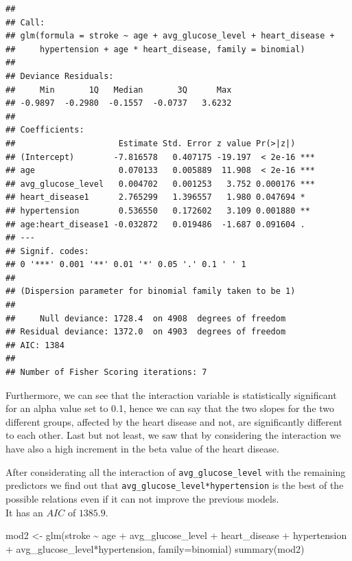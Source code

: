 \documentclass[
]{article}
\newenvironment{Shaded}{\begin{snugshade}}{\end{snugshade}}
\newcommand{\AttributeTok}[1]{\textcolor[rgb]{0.77,0.63,0.00}{#1}}
\newcommand{\FunctionTok}[1]{\textcolor[rgb]{0.00,0.00,0.00}{#1}}
\newcommand{\NormalTok}[1]{#1}
\newcommand{\OtherTok}[1]{\textcolor[rgb]{0.56,0.35,0.01}{#1}}
\newcommand{\SpecialCharTok}[1]{\textcolor[rgb]{0.00,0.00,0.00}{#1}}
\begin{document}
\begin{verbatim}
## 
## Call:
## glm(formula = stroke ~ age + avg_glucose_level + heart_disease + 
##     hypertension + age * heart_disease, family = binomial)
## 
## Deviance Residuals: 
##     Min       1Q   Median       3Q      Max  
## -0.9897  -0.2980  -0.1557  -0.0737   3.6232  
## 
## Coefficients:
##                     Estimate Std. Error z value Pr(>|z|)    
## (Intercept)        -7.816578   0.407175 -19.197  < 2e-16 ***
## age                 0.070133   0.005889  11.908  < 2e-16 ***
## avg_glucose_level   0.004702   0.001253   3.752 0.000176 ***
## heart_disease1      2.765299   1.396557   1.980 0.047694 *  
## hypertension        0.536550   0.172602   3.109 0.001880 ** 
## age:heart_disease1 -0.032872   0.019486  -1.687 0.091604 .  
## ---
## Signif. codes:  
## 0 '***' 0.001 '**' 0.01 '*' 0.05 '.' 0.1 ' ' 1
## 
## (Dispersion parameter for binomial family taken to be 1)
## 
##     Null deviance: 1728.4  on 4908  degrees of freedom
## Residual deviance: 1372.0  on 4903  degrees of freedom
## AIC: 1384
## 
## Number of Fisher Scoring iterations: 7
\end{verbatim}

Furthermore, we can see that the interaction variable is statistically
significant for an alpha value set to 0.1, hence we can say that the two
slopes for the two different groups, affected by the heart disease and
not, are significantly different to each other. Last but not least, we
saw that by considering the interaction we have also a high increment in
the beta value of the heart disease.

After considerating all the interaction of \texttt{avg\_glucose\_level} with
the remaining predictors we find out that
\texttt{avg\_glucose\_level*hypertension} is the best of the possible
relations even if it can not improve the previous models.\\
It has an \(AIC\) of \(1385.9\).

\begin{Shaded}
\begin{Highlighting}[]
\NormalTok{mod2 }\OtherTok{\textless{}{-}} \FunctionTok{glm}\NormalTok{(stroke }\SpecialCharTok{\textasciitilde{}}\NormalTok{ age }\SpecialCharTok{+}\NormalTok{ avg\_glucose\_level }\SpecialCharTok{+}\NormalTok{ heart\_disease }\SpecialCharTok{+}\NormalTok{ hypertension }\SpecialCharTok{+}
\NormalTok{              avg\_glucose\_level}\SpecialCharTok{*}\NormalTok{hypertension, }\AttributeTok{family=}\NormalTok{binomial)}
\FunctionTok{summary}\NormalTok{(mod2)}
\end{Highlighting}
\end{Shaded}
\end{document}
